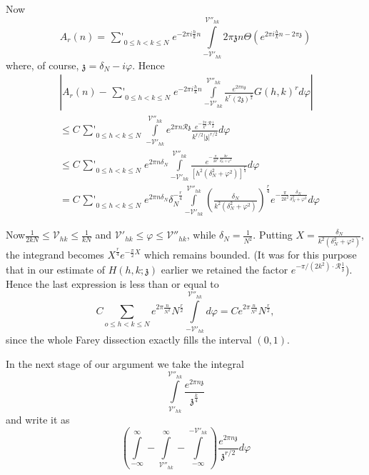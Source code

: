 Now\pageoriginale
$$
A_r (n) = \mathop{\textstyle\sum'}_{0 \leq h < k \leq N} e^{-2 \pi i \frac{h}{k} n}
\int\limits_{- \mathscr{V}'_{hk}}^{\mathscr{V}''_{hk}} 2 \pi
\mathfrak{z} n \Theta \left(e^{2 \pi i \frac{h}{k} n-2 \pi \mathfrak{z}} \right)
$$
where, of course, $\mathfrak{z}= \delta_N - i \varphi$. Hence
\begin{align*}
  & \left| A_r (n)  - \mathop{\textstyle\sum'}_{0 \leq h < k \leq N}
  e^{-2 \pi i \frac{h}{k}
    n} \int\limits^{\mathscr{V}''_{hk}}_{-\mathscr{V}'_{hk}}
  \frac{e^{2\pi n \mathfrak{z}}}{k^r(2\mathfrak{z})^{\frac{r}{2}}} G(h,
  k)^r d \varphi\right|\\
  & \leq C \mathop{\textstyle\sum'}_{0 \leq h < k \leq N}
  \int\limits_{-\mathscr{V}'_{hk}}^{\mathscr{V}''_{hk}} e^{2 \pi n
    \mathscr{R} \mathfrak{z}} \frac{e^{- \frac{2 \pi}{k^2}\mathscr{R}
      \frac{1}{\mathfrak{z}}}}{k^{r/2}|\mathfrak{z}|^{r/2}} d \varphi\\
  & \leq C \mathop{\textstyle\sum'}_{0 \leq h < k \leq N} e^{2 \pi n \delta_N}
  \int\limits_{- \mathscr{V}'_{hk}}^{\mathscr{V}''_{hk}} \frac{e^{-
      \frac{\pi}{2k^2} \frac{\delta \nu}{\delta_N^2 +
        \varphi^2}}}{\left[h^2 (\delta_N^2 + \varphi^2)
      \right]^{\frac{r}{4}}} d \varphi\\
  & = C \mathop{\textstyle\sum'}_{0 \leq h < k \leq N} e^{2 \pi n \delta_N} \delta_N^{-
    \frac{r}{4}} \int\limits_{-
    \mathscr{V}'_{hk}}^{\mathscr{V}''_{hk}} \left(\frac{\delta_N}{k^2
    (\delta_N^2 + \varphi^2)} \right)^{\frac{r}{4}} e^{-
    \frac{\pi}{2k^2} \frac{\delta_N}{\delta_N^2 + \varphi^2}} d \varphi
\end{align*}

Now\pageoriginale $\frac{1}{2k N} \leq \mathscr{V}_{hk} \leq
\frac{1}{kN}$ and $\mathscr{V}'_{hk} \leq \varphi \leq
\mathscr{V}''_{hk}$, while $\delta_N = \frac{1}{N^2}$. Putting $X=
  \frac{\delta_N}{k^2(\delta_N^2 + \varphi^2)}$, the integrand becomes
  $X^{\frac{r}{4}} e^{- \frac{\pi}{2} X}$ which remains bounded. (It
  was for this purpose that in our estimate of $H (h, k;
  \mathfrak{z})$ earlier we retained the factor $e^{- \pi/(2k^2) \cdot
  \mathscr{R} \frac{1}{\mathfrak{z}}}$). Hence the last expression is
  less than or equal to 
$$
C \sum_{o \leq h < k \leq N} e^{2 \pi \frac{n}{N^2}} N^{\frac{r}{2}}
\int\limits^{\mathscr{V}''_{hk}}_{-\mathscr{V}'_{hk}} d\varphi= C
e^{2\pi \frac{n}{N^2}} N^{\frac{r}{2}},
$$
since the whole Farey dissection exactly fills the interval $(0, 1)$. 

In the next stage of our argument we take the integral
$$
\int\limits_{\mathscr{V}'_{hk}}^{\mathscr{V}''_{hk}} \frac{e^{2 \pi n
    \mathfrak{z}}}{\mathfrak{z}^{\frac{k}{4}}} 
$$
and write it as
$$
\left( \int\limits^\infty_{- \infty} -
\int\limits^\infty_{\mathscr{V}''_{hk}} - \int\limits^{-
  \mathscr{V}'_{hk}}_{- \infty}\right) \frac{e^{2 \pi n
    \mathfrak{z}}}{\mathfrak{z}^{r/2}} d \varphi 
$$

